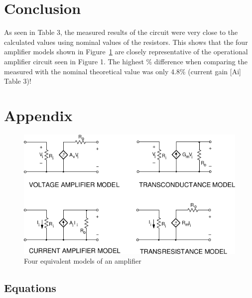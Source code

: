 \documentclass{article}
\begin{document}
\section{Conclusion}
\label{sec:conclusion}

As seen in Table 3, the measured results of the circuit were very
close to the calculated values using nominal values of the resistors.
This shows that the four amplifier models shown in
Figure~\ref{fig:amp_models} are closely representative of the
operational amplifier circuit seen in Figure 1.  The highest \%
difference when comparing the measured with the nominal theoretical
value was only 4.8\% (current gain [Ai] Table 3)!
\section{Appendix}
\label{sec:appendix}

\begin{figure}[h]
  \centering
  \includegraphics[width=\textwidth]{img/amp_models}
  \caption{Four equivalent models of an amplifier}
  \label{fig:amp_models}
\end{figure}

\subsection*{Equations}
\end{document}
